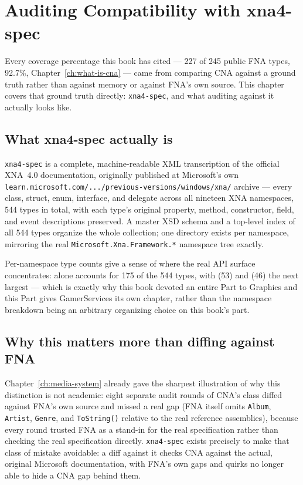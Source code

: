 \chapter{Auditing Compatibility with xna4-spec}
\label{ch:xna4-spec-auditing}

Every coverage percentage this book has cited --- 227 of 245 public FNA types, 92.7\%,
Chapter~\ref{ch:what-is-cna} --- came from comparing CNA against a ground truth rather than
against memory or against FNA's own source. This chapter covers that ground truth directly:
\texttt{xna4-spec}, and what auditing against it actually looks like.

\section{What xna4-spec actually is}

\texttt{xna4-spec} is a complete, machine-readable XML transcription of the official XNA~4.0
documentation, originally published at Microsoft's own
\texttt{learn.microsoft.com/.../previous-versions/windows/xna/} archive --- every class,
struct, enum, interface, and delegate across all nineteen XNA namespaces, 544 types in total,
with each type's original property, method, constructor, field, and event descriptions
preserved. A master XSD schema and a top-level index of all 544 types organize the whole
collection; one directory exists per namespace, mirroring the real
\texttt{Microsoft.Xna.Framework.*} namespace tree exactly.

Per-namespace type counts give a sense of where the real API surface concentrates:
 alone accounts for 175 of the 544 types, with
 (53) and  (46) the next largest ---
which is exactly why this book devoted an entire Part to Graphics and this Part gives
GamerServices its own chapter, rather than the namespace breakdown being an arbitrary
organizing choice on this book's part.

\section{Why this matters more than diffing against FNA}

Chapter~\ref{ch:media-system} already gave the sharpest illustration of why this distinction
is not academic: eight separate audit rounds of CNA's  class diffed against
FNA's own source and missed a real gap (FNA itself omits \texttt{Album}, \texttt{Artist},
\texttt{Genre}, and \texttt{ToString()} relative to the real reference assemblies), because
every round trusted FNA as a stand-in for the real specification rather than checking the
real specification directly. \texttt{xna4-spec} exists precisely to make that class of
mistake avoidable: a diff against it checks CNA against the actual, original Microsoft
documentation, with FNA's own gaps and quirks no longer able to hide a CNA gap behind them.

